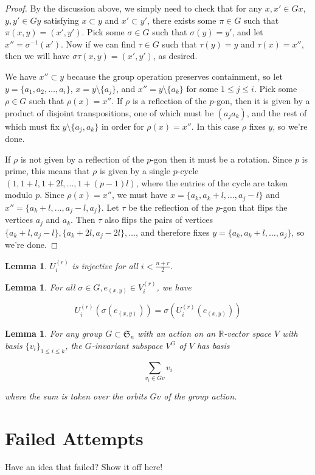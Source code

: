 \documentclass[11pt]{amsart}
\newtheorem{lem}[thm]{Lemma}
\theoremstyle{definition}
\begin{document}
\begin{proof}
By the discussion above, we simply need to check that for any $x,x'\in Gx$, $y,y'\in Gy$ satisfying $x\subset y$ and $x'\subset y'$, there exists some $\pi\in G$ such that $\pi(x,y) = (x',y')$.  Pick some $\sigma\in G$ such that $\sigma(y) = y'$, and let $x'' = \sigma^{-1}(x')$.  Now if we can find $\tau\in G$ such that $\tau(y) = y$ and $\tau(x) = x''$, then we will have $\sigma\tau(x,y) = (x',y')$, as desired.

We have $x''\subset y$ because the group operation preserves containment, so let $y = \{a_1,a_2,\ldots,a_i\}$, $x = y\setminus \{a_j\}$, and $x'' = y\setminus \{a_k\}$ for some $1\le j \le i$.  Pick some $\rho\in G$ such that $\rho(x) = x''$.  If $\rho$ is a reflection of the $p$-gon, then it is given by a product of disjoint transpositions, one of which must be $(a_ja_k)$, and the rest of which must fix $y\setminus \{a_j,a_k\}$ in order for $\rho(x) = x''$.  In this case $\rho$ fixes $y$, so we're done.

If $\rho$ is not given by a reflection of the $p$-gon then it must be a rotation.  Since $p$ is prime, this means that $\rho$ is given by a single $p$-cycle $(1,1+l,1+2l,\ldots,1+(p-1)l)$, where the entries of the cycle are taken modulo $p$.  Since $\rho(x) = x''$, we must have $x = \{a_k,a_k + l,\ldots,a_j - l\}$ and $x'' = \{a_k + l, \ldots,a_j - l, a_j\}$.  Let $\tau$ be the reflection of the $p$-gon that flips the vertices $a_j$ and $a_k$.  Then $\tau$ also flips the pairs of vertices $\{a_k + l,a_j - l\}, \{a_k + 2l,a_j - 2l\}, \ldots$, and therefore fixes $y = \{a_k,a_k + l, \ldots, a_j\}$, so we're done.
\end{proof}


\begin{lem}\label{lem:U_injective}
$U_i^{(r)}$ is injective for all $i < \frac{n + r}{2}$.
\end{lem}



\begin{lem}\label{lem:U_commutes_with_action}
For all $\sigma\in G, e_{(x,y)}\in V_i^{(r)}$, we have

$$U_i^{(r)}(\sigma(e_{(x,y)})) = \sigma(U_i^{(r)}(e_{(x,y)}))$$

\end{lem}


\begin{lem}\label{lem:G_invariant_basis}
For any group $G\subset \mathfrak{S}_n$ with an action on an $\mathbb{R}$-vector space $V$ with basis $\{v_i\}_{1\le i\le k}$, the $G$-invariant subspace $V^G$ of $V$ has basis

$$\sum_{v_i\in Gv} v_i $$

\noindent where the sum is taken over the orbits $Gv$ of the group action.
\end{lem}



\section{Failed Attempts}
Have an idea that failed?  Show it off here!
\end{document}
